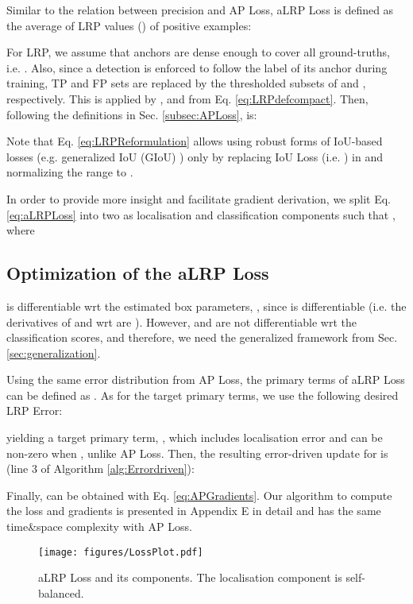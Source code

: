 \documentclass{article}
\begin{document}
Similar to the relation between precision and AP Loss, aLRP Loss is defined as the average of LRP values () of positive examples:

For LRP, we assume that anchors are dense enough to cover all ground-truths, i.e. . Also, since a detection is enforced to follow the label of its anchor during training, TP and FP sets are replaced by the thresholded subsets of  and ,  respectively. This is applied by , and  from Eq. \eqref{eq:LRPdefcompact}. Then, following the definitions in Sec. \ref{subsec:APLoss},  is:

Note that Eq. \eqref{eq:LRPReformulation}  allows using robust forms of IoU-based  losses (e.g. generalized IoU (GIoU) \cite{GIoULoss}) only by replacing IoU Loss (i.e. ) in  and normalizing the range to .

In order to provide more insight and facilitate gradient derivation, we split Eq. \eqref{eq:aLRPLoss} into two as localisation and classification components such that , where


\subsection{Optimization of the aLRP Loss}
 is differentiable wrt the estimated box parameters, , since  is differentiable \cite{GIoULoss,UnitBox} (i.e. the derivatives of  and  wrt  are ). However,  and  are not differentiable wrt the classification scores, and therefore, we need the generalized framework from Sec. \ref{sec:generalization}. 

Using the same error distribution from AP Loss, the primary terms of aLRP Loss can be defined as . As for the target primary terms, we use the following desired LRP Error:


yielding a target primary term, , which includes localisation error and can be non-zero when , unlike AP Loss. Then, the resulting error-driven update for  is (line 3 of Algorithm \ref{alg:Errordriven}):

Finally,  can be obtained with Eq. \eqref{eq:APGradients}. Our algorithm to compute the loss and gradients is presented in Appendix E in detail and has the same time\&space complexity with AP Loss. 

\begin{wrapfigure}{r}{0.49\textwidth}
  \begin{center}
    \texttt{[image: figures/LossPlot.pdf]}
  \end{center}
    \caption{aLRP Loss and its components. The localisation component is self-balanced.\label{fig:LossPlot}}
\end{wrapfigure}
\end{document}

